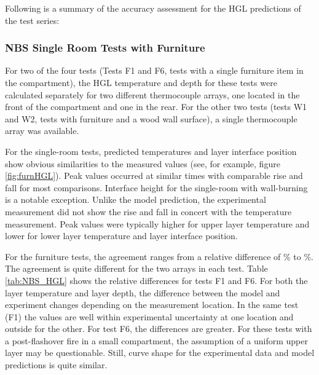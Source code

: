 Following is a summary of the accuracy assessment for the HGL predictions of the test series:

\subsubsection{NBS Single Room Tests with Furniture}

For two of the four tests (Tests F1 and F6, tests with a single furniture item in the compartment), the HGL temperature and depth for these tests were calculated separately for two different thermocouple arrays, one located in the front of the compartment and one in the rear. For the other two tests (tests W1 and W2, tests with furniture and a wood wall surface), a single thermocouple array was available.

For the single-room tests, predicted temperatures and layer interface position show obvious
similarities to the measured values (see, for example, figure \ref{fig:furnHGL}). Peak values occurred at similar times with comparable rise
and fall for most comparisons. Interface height for the single-room with wall-burning is a
notable exception. Unlike the model prediction, the experimental measurement did not show the
rise and fall in concert with the temperature measurement. Peak values were typically higher for
upper layer temperature and lower for lower layer temperature and layer interface position.

For the furniture tests, the agreement ranges from a relative difference of \HGLfurnlow \% to \HGLfurnhi \%.  The agreement is quite different for the two arrays in each test. Table \ref{tab:NBS_HGL} shows the relative differences for tests F1 and F6.  For both the layer temperature and layer depth, the difference between the model and experiment changes depending on the measurement location. In the same test (F1) the values are well within experimental uncertainty at one location and outside for the other.   For test F6, the differences are greater.   For these tests with a post-flashover fire in a small compartment, the assumption of a uniform upper layer may be questionable. Still, curve shape for the experimental data and model predictions is quite similar.

